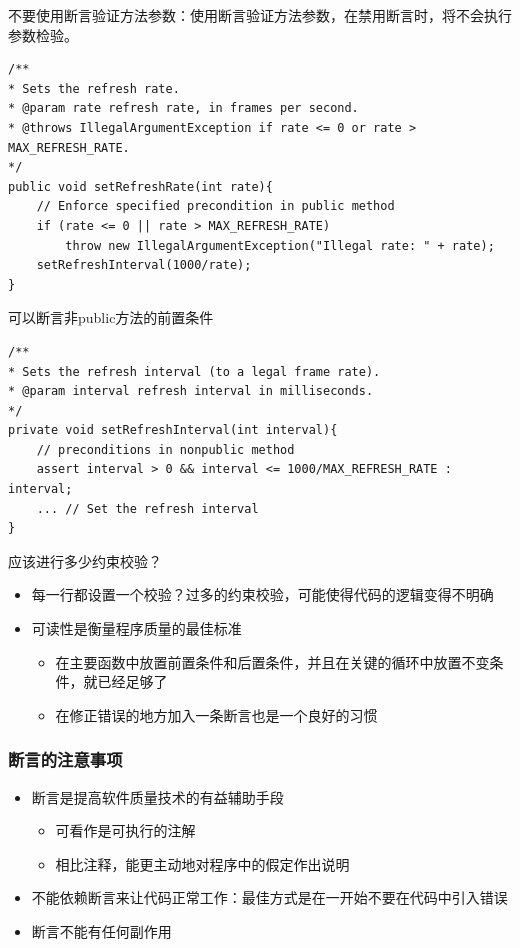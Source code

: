 不要使用断言验证方法参数：使用断言验证方法参数，在禁用断言时，将不会执行参数检验。
\begin{lstlisting}
/**
* Sets the refresh rate.
* @param rate refresh rate, in frames per second.
* @throws IllegalArgumentException if rate <= 0 or rate > MAX_REFRESH_RATE.
*/
public void setRefreshRate(int rate){
    // Enforce specified precondition in public method
    if (rate <= 0 || rate > MAX_REFRESH_RATE)
        throw new IllegalArgumentException("Illegal rate: " + rate);
    setRefreshInterval(1000/rate);
}
\end{lstlisting}

可以断言非public方法的前置条件
\begin{lstlisting}
/**
* Sets the refresh interval (to a legal frame rate).
* @param interval refresh interval in milliseconds.
*/
private void setRefreshInterval(int interval){
    // preconditions in nonpublic method
    assert interval > 0 && interval <= 1000/MAX_REFRESH_RATE : interval;
    ... // Set the refresh interval
}
\end{lstlisting}

应该进行多少约束校验？
\begin{itemize}
    \item 每一行都设置一个校验？过多的约束校验，可能使得代码的逻辑变得不明确
    \item 可读性是衡量程序质量的最佳标准
    \begin{itemize}
        \item 在主要函数中放置前置条件和后置条件，并且在关键的循环中放置不变条件，就已经足够了
        \item 在修正错误的地方加入一条断言也是一个良好的习惯
    \end{itemize}
\end{itemize}

\subsubsection{断言的注意事项}
\begin{itemize}
    \item 断言是提高软件质量技术的有益辅助手段
    \begin{itemize}
        \item 可看作是可执行的注解
        \item 相比注释，能更主动地对程序中的假定作出说明
    \end{itemize}
    \item 不能依赖断言来让代码正常工作：最佳方式是在一开始不要在代码中引入错误
    \item 断言不能有任何副作用
\end{itemize}

